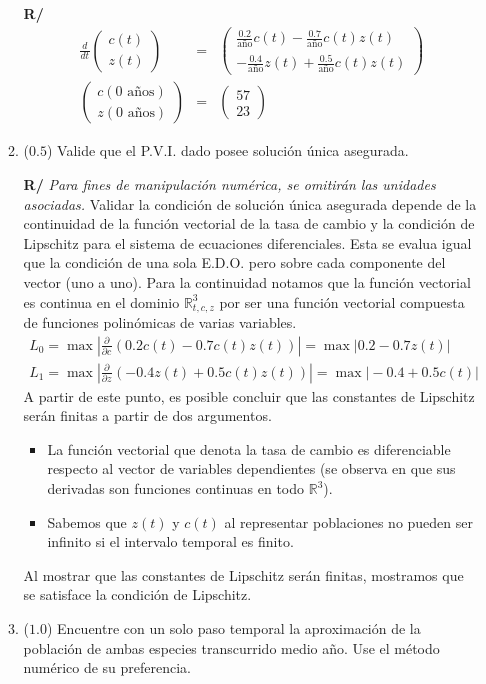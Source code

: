 \documentclass[12pt]{article}
\newcommand{\R}{\ensuremath{\mathbb{R}}}
\newcommand{\diff}[3]{\frac{d^{#3} #1}{d#2^{#3}}}
\newcommand{\pdiff}[3]{\frac{\partial^{#3} #1}{\partial#2^{#3}}}
\begin{document}
\begin{enumerate}[leftmargin=*,widest=9]
\begin{enumerate}[label=\alph*]
\textbf{R/}
    \begin{eqnarray*}
    \diff{}{t}{}\begin{pmatrix} c(t) \\ z(t)
    \end{pmatrix} &=& \begin{pmatrix} \frac{0.2}{\text{año}} c(t) - \frac{0.7}{\text{año}} c(t) z(t) \\ -\frac{0.4}{\text{año}} z(t) + \frac{0.5}{\text{año}} c(t) z(t)
    \end{pmatrix} \\
    \begin{pmatrix} c(0 \text{ años}) \\ z(0 \text{ años})
    \end{pmatrix} &=& \begin{pmatrix} 57 \\ 23 \end{pmatrix}
    \end{eqnarray*}
    \item (\(0.5\)) Valide que el P.V.I. dado posee solución única asegurada.

\textbf{R/} \textit{Para fines de manipulación numérica, se omitirán las unidades asociadas.}
    Validar la condición de solución única asegurada depende de la continuidad de la función vectorial de la tasa de cambio y la condición de Lipschitz para el sistema de ecuaciones diferenciales. Esta se evalua igual que la condición de una sola E.D.O. pero sobre cada componente del vector (uno a uno). Para la continuidad notamos que la función vectorial es continua en el dominio \(\R^3_{t,c,z}\) por ser una función vectorial compuesta de funciones polinómicas de varias variables.
    \begin{eqnarray*}
    L_0 = \max \left\vert \pdiff{}{c}{} (0.2 c(t) - 0.7 c(t) z(t)) \right\vert = \max \vert 0.2 - 0.7 z(t)\vert \\
    L_1 = \max \left\vert \pdiff{}{z}{} (-0.4 z(t) + 0.5 c(t) z(t)) \right\vert = \max \vert -0.4 + 0.5 c(t) \vert
    \end{eqnarray*}
    A partir de este punto, es posible concluir que las constantes de Lipschitz serán finitas a partir de dos argumentos.
    \begin{itemize}
\item La función vectorial que denota la tasa de cambio es diferenciable respecto al vector de variables dependientes (se observa en que sus derivadas son funciones continuas en todo \(\R^3\)).
\item Sabemos que \(z(t)\) y \(c(t)\) al representar poblaciones no pueden ser infinito si el intervalo temporal es finito.
    \end{itemize}
    Al mostrar que las constantes de Lipschitz serán finitas, mostramos que se satisface la condición de Lipschitz.
    \item (\(1.0\)) Encuentre con un solo paso temporal la aproximación de la población de ambas especies transcurrido medio año. Use el método numérico de su preferencia.


\end{enumerate}
\end{enumerate}
\end{document}
